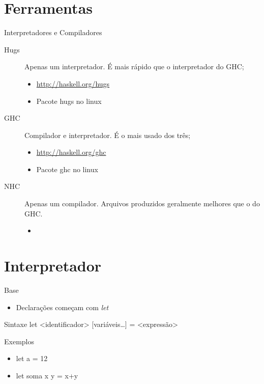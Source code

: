 \documentclass{beamer}
\begin{document}
\section{Ferramentas}

	\begin{frame}{Interpretadores e Compiladores}
	 
	 \begin{description}
	  \item [Hugs] Apenas um interpretador. É mais rápido que o interpretador do GHC;
			\begin{itemize}
			 \item \url{http://haskell.org/hugs}
			 \item Pacote hugs no linux
			\end{itemize}
	  \item [GHC] Compilador e interpretador. É o mais usado dos três;
			\begin{itemize}
			 \item \url{http://haskell.org/ghc}
			 \item Pacote ghc no linux
			\end{itemize}
	  \item [NHC] Apenas um compilador. Arquivos produzidos geralmente melhores que o do GHC.
			\begin{itemize}
			 \item 
			\end{itemize}
	 \end{description}	 
	\end{frame}
	
\section{Interpretador}

	\begin{frame}{Base}
	 	 \begin{itemize}
	 	  \item Declarações começam com \textit{let}
	 	 \end{itemize}
	 	 \begin{block}{Sintaxe}
	 	  let <identificador> {[}variáveis\dots{]} = <expressão>
	 	 \end{block}
	 	 \begin{block}{Exemplos}
	 	  \begin{itemize}
	 	   \item let a = 12
	 	   \item let soma x y = x+y
	 	  \end{itemize}
	 	 \end{block}
	\end{frame}
	
\end{document}
